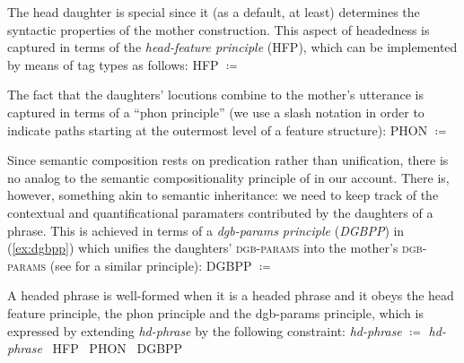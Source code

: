 \documentclass[output=paper
	        ,collection
	        ,collectionchapter
 	        ,biblatex
                ,babelshorthands
                ,newtxmath
                ,draftmode
                ,colorlinks, citecolor=brown
]{langscibook}
\begin{document}
The head daughter is special since it (as a default, at least) determines the syntactic properties of the mother construction. 
%
This aspect of headedness is captured in terms of the \emph{head-feature principle} (HFP), which can be implemented by means of tag types as follows:
%
\ea \label{ex:HFP}
HFP $\coloneqq$
\z

The fact that the daughters' locutions combine to the mother's utterance is captured in terms of a \enquote{phon principle}  (we use a slash notation in order to indicate paths starting at the outermost level of a feature structure):
%
\ea 
PHON $\coloneqq$ \label{ex:phon-principle}
\z 

Since  semantic composition rests on predication rather than unification, there is no analog to the semantic compositionality principle of \citet{Sag:Wasow:Bender:2003} in our account.
%
There is, however, something akin to semantic inheritance: we need to keep track of the contextual and quantificational paramaters contributed by the daughters of a phrase. 
%
This is achieved in terms of a \emph{dgb-params principle} (\emph{DGBPP}) in (\ref{ex:dgbpp}) which unifies the daughters' \textsc{dgb-params} into the mother's \textsc{dgb-params}  (see \citealt[126 \textit{et seq.}]{Ginzburg:2012}  for a similar principle): 
%
\ea \label{ex:dgbpp}
DGBPP $\coloneqq$ \label{ex:QPP} \par\medskip
{}
\z

A headed phrase is well-formed when it is a headed phrase and it obeys the head feature principle, the phon principle and the dgb-params principle, which is expressed by extending \emph{hd-phrase} by the following constraint:
%
\ea \label{ex:hd-phrase}
\emph{hd-phrase} $\coloneqq$ 
\emph{hd-phrase} \ttrmerge\ {HFP} \ttrmerge\  {PHON} \ttrmerge\ {DGBPP}
\z
\end{document}
